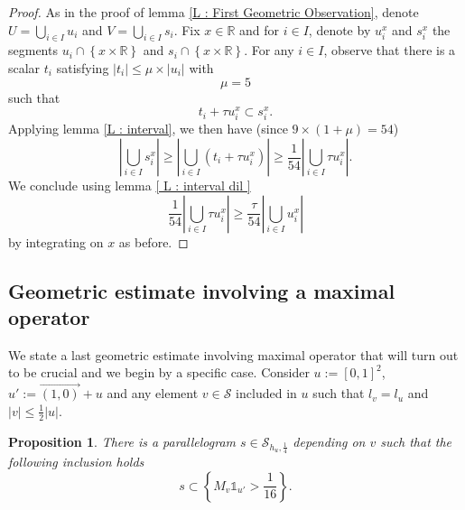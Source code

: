 \documentclass{article}
\newtheorem{prp}{Proposition}
\begin{document}
\begin{proof}
As in the proof of lemma \ref{L : First Geometric Observation}, denote $U = \bigcup_{i \in I} u_i$ and $V = \bigcup_{i \in I} s_i $. Fix $x \in \mathbb{R}$ and for $i \in I$, denote by $u_i^x$ and $s_i^{x}$ the segments $u_i \cap \left\{ {x} \times \mathbb{R} \right\}$ and $s_i  \cap \left\{ {x} \times \mathbb{R} \right\}$. For any $i \in I$, observe that there is a scalar $t_i$ satisfying $|t_i| \leq \mu \times |u_i|$ with $$ \mu = 5 $$ such that $$t_i + \tau u_i^x \subset s_i^x.$$ Applying lemma \ref{L : interval}, we then have (since $9 \times (1+\mu) = 54$) $$\left|\bigcup_{i \in I} s_i^x\right| \geq \left| \bigcup_{i \in I} \left(t_i + \tau u_i^x\right) \right| \geq \frac{1}{54} \left|\bigcup_{i \in I} \tau u_i^x\right|.$$ We conclude using lemma \ref{ L : interval dil } $$\frac{1}{54} \left|\bigcup_{i \in I} \tau u_i^x\right| \geq \frac{\tau}{54}  \left|\bigcup_{i \in I}  u_i^x\right|$$ by integrating on $x$ as before. 

\end{proof}

































\subsection*{Geometric estimate involving a maximal operator}




We state a last geometric estimate involving maximal operator that will turn out to be crucial and we begin by a specific case. Consider $u := [0,1]^2$, $u' := \overrightarrow{(1,0)} + u$ and any element $v \in \mathcal{S}$ included in $u$ such that $l_v = l_u $ and $|v| \leq \frac{1}{2}|u|$.





\begin{prp}
There is a parallelogram $s \in \mathcal{S}_{h_u, \frac{1}{4}}$ depending on $v$ such that the following inclusion holds $$s \subset \left\{ M_v \mathbb{1}_{u'} > \frac{1}{16} \right\}.$$
\end{prp}
\end{document}
